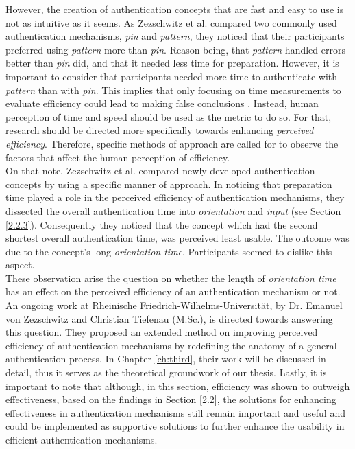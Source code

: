 However, the creation of authentication concepts that are fast and easy to use is not as intuitive as it seems. As Zezschwitz et al. \cite{PatternWild} compared two commonly used authentication mechanisms, \textit{pin} and \textit{pattern}, they noticed that their participants preferred using \textit{pattern} more than \textit{pin}. Reason being, that \textit{pattern} handled errors better than \textit{pin} did, and that it needed less time for preparation. However, it is important to consider that participants needed more time to authenticate with \textit{pattern} than with \textit{pin}. This implies that only focusing on time measurements to evaluate efficiency could lead to making false conclusions \cite{Zezschwitz}. Instead, human perception of time and speed should be used as the metric to do so. For that, research should be directed more specifically towards enhancing \textit{perceived efficiency}. Therefore, specific methods of approach are called for to observe the factors that affect the human perception of efficiency. \\

On that note, Zezschwitz et al. \cite{Marbles} compared newly developed authentication concepts by using a specific manner of approach. In noticing that preparation time played a role in the perceived efficiency of authentication mechanisms, they dissected the overall authentication time into \textit{orientation} and \textit{input} (see Section \ref{2.2.3}). Consequently they noticed that the concept which had the second shortest overall authentication time, was perceived least usable. The outcome was due to the concept's long \textit{orientation time}. Participants seemed to dislike this aspect.\\
These observation arise the question on whether the length of \textit{orientation time} has an effect on the perceived efficiency of an authentication mechanism or not. An ongoing work at Rheinische Friedrich-Wilhelms-Universit{\"a}t, by Dr. Emanuel von Zezschwitz and Christian Tiefenau (M.Sc.), is directed towards answering this question. They proposed an extended method on improving perceived efficiency of authentication mechanisms by redefining the anatomy of a general authentication process. In Chapter \ref{ch:third}, their work will be discussed in detail, thus it serves as the theoretical groundwork of our thesis. Lastly, it is important to note that although, in this section, efficiency was shown to outweigh effectiveness, based on the findings in Section \ref{2.2}, the solutions for enhancing effectiveness in authentication mechanisms still remain important and useful and could be implemented as supportive solutions to further enhance the usability in efficient authentication mechanisms.



